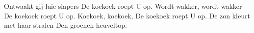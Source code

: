 \beginverse*
Ontwaakt gij luie slapers
De koekoek roept U op.
\endverse
\beginverse*
Wordt wakker, wordt wakker
De koekoek roept U op. 
\endverse
\beginverse*
Koekoek, koekoek,
De koekoek roept U op. 
\endverse
\beginverse*
De zon kleurt met haar stralen
Den groenen heuveltop.
\endverse
\endsong 